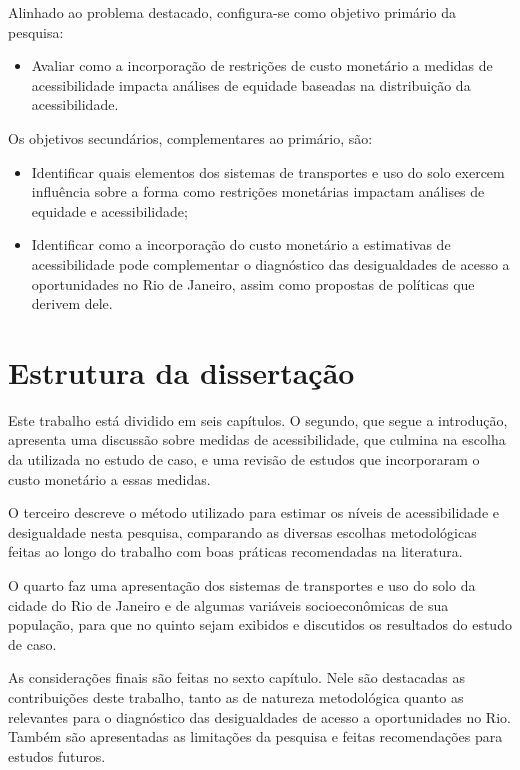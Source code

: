 \documentclass[msc,numbers]{coppe}
\providecommand{\tightlist}{%
  \setlength{\itemsep}{0pt}\setlength{\parskip}{0pt}}
\begin{document}
  Alinhado ao problema destacado, configura-se como objetivo primário da pesquisa:
  \begin{itemize}
  \tightlist
  \item
    Avaliar como a incorporação de restrições de custo monetário a medidas de acessibilidade impacta análises de equidade baseadas na distribuição da acessibilidade.
  \end{itemize}
  Os objetivos secundários, complementares ao primário, são:
  \begin{itemize}
  \item
    Identificar quais elementos dos sistemas de transportes e uso do solo exercem influência sobre a forma como restrições monetárias impactam análises de equidade e acessibilidade;
  \item
    Identificar como a incorporação do custo monetário a estimativas de acessibilidade pode complementar o diagnóstico das desigualdades de acesso a oportunidades no Rio de Janeiro, assim como propostas de políticas que derivem dele.
  \end{itemize}
  \hypertarget{estrutura-da-dissertauxe7uxe3o}{%
  \section{Estrutura da dissertação}\label{estrutura-da-dissertauxe7uxe3o}}

  Este trabalho está dividido em seis capítulos. O segundo, que segue a introdução, apresenta uma discussão sobre medidas de acessibilidade, que culmina na escolha da utilizada no estudo de caso, e uma revisão de estudos que incorporaram o custo monetário a essas medidas.

  O terceiro descreve o método utilizado para estimar os níveis de acessibilidade e desigualdade nesta pesquisa, comparando as diversas escolhas metodológicas feitas ao longo do trabalho com boas práticas recomendadas na literatura.

  O quarto faz uma apresentação dos sistemas de transportes e uso do solo da cidade do Rio de Janeiro e de algumas variáveis socioeconômicas de sua população, para que no quinto sejam exibidos e discutidos os resultados do estudo de caso.

  As considerações finais são feitas no sexto capítulo. Nele são destacadas as contribuições deste trabalho, tanto as de natureza metodológica quanto as relevantes para o diagnóstico das desigualdades de acesso a oportunidades no Rio. Também são apresentadas as limitações da pesquisa e feitas recomendações para estudos futuros.
\end{document}
